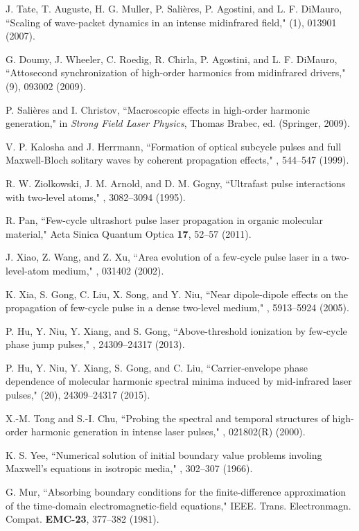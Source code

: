 \documentclass[10pt,letterpaper]{article}
\begin{document}
\begin{thebibliography}{99}
J. Tate, T. Auguste, H. G. Muller, P. Sali\`{e}res, P. Agostini, and L. F. DiMauro, ``Scaling of wave-packet dynamics in an intense midinfrared field," (1), 013901 (2007).

G. Doumy, J. Wheeler, C. Roedig, R. Chirla, P. Agostini, and L. F. DiMauro, ``Attosecond synchronization of high-order harmonics from midinfrared drivers," (9), 093002 (2009).

P. Sali\`{e}res and I. Christov, ``Macroscopic effects in high-order harmonic generation," in \emph{Strong Field Laser Physics}, Thomas Brabec, ed. (Springer, 2009).

V. P. Kalosha and J. Herrmann, ``Formation of optical subcycle pulses and full Maxwell-Bloch solitary waves by coherent propagation effects," , 544--547 (1999).

R. W. Ziolkowski, J. M. Arnold, and D. M. Gogny, ``Ultrafast pulse interactions with two-level atoms," , 3082--3094 (1995).


R. Pan, ``Few-cycle ultrashort pulse laser propagation in organic molecular material," Acta Sinica Quantum Optica {\bf 17}, 52--57 (2011).

J. Xiao, Z. Wang, and Z. Xu, ``Area evolution of a few-cycle pulse laser in a two-level-atom medium," , 031402 (2002).

K. Xia, S. Gong, C. Liu, X. Song, and Y. Niu, ``Near dipole-dipole effects on the propagation of few-cycle pulse in a dense two-level medium," , 5913--5924 (2005).


P. Hu, Y. Niu, Y. Xiang, and S. Gong, ``Above-threshold ionization by few-cycle phase jump pulses," , 24309--24317 (2013).

P. Hu, Y. Niu, Y. Xiang, S. Gong, and C. Liu, ``Carrier-envelope phase dependence of molecular harmonic spectral minima induced by mid-infrared laser pulses," (20), 24309--24317 (2015).

X.-M. Tong and S.-I. Chu, ``Probing the spectral and temporal structures of high-order harmonic generation in intense laser pulses," , 021802(R) (2000).

K. S. Yee, ``Numerical solution of initial boundary value problems involing Maxwell's equations in isotropic media," , 302--307 (1966).

G. Mur, ``Absorbing boundary conditions for the finite-difference approximation of the time-domain electromagnetic-field equations," IEEE. Trans. Electronmagn. Compat. {\bf EMC-23}, 377--382 (1981).
	
\end{thebibliography}
\end{document}
